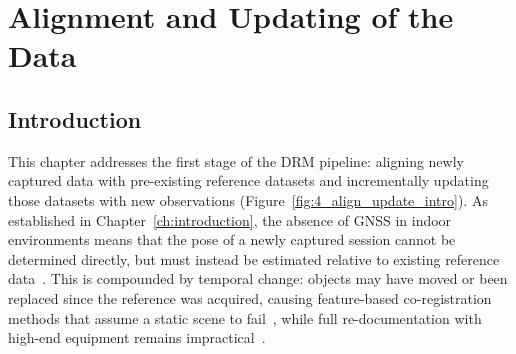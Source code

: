 \cleardoublepage
{}
\cleardoublepage


\chapter{Alignment and Updating of the Data}
\label{ch:4_Alignment_Updating}



\section{Introduction}
\label{sec:4_intro}

This chapter addresses the first stage of the \gls{DRM} pipeline: aligning newly captured data with pre-existing reference datasets and incrementally updating those datasets with new observations (Figure~\ref{fig:4_align_update_intro}). As established in Chapter~\ref{ch:introduction}, the absence of \gls{GNSS} in indoor environments means that the pose of a newly captured session cannot be determined directly, but must instead be estimated relative to existing reference data~\cite{vermandere_two-step_2022}. This is compounded by temporal change: objects may have moved or been replaced since the reference was acquired, causing feature-based co-registration methods that assume a static scene to fail~\cite{vermandere_two-step_2022}, while full re-documentation with high-end equipment remains impractical~\cite{bassier_standalone_2016, bassier_geomapi_2024}.

